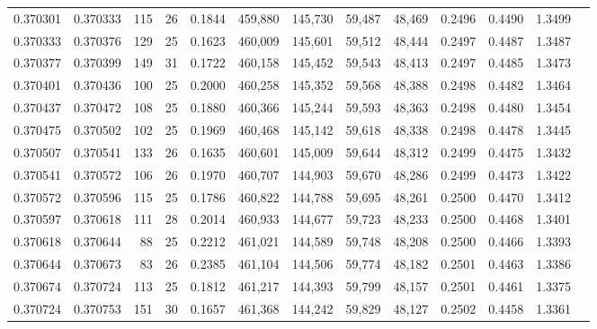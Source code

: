 \begin{tabular}{rrrrrrrrrrrrr}
0.370301 & 0.370333 &   115 &  26 &                                     0.1844 & 459,880 & 145,730 &  59,487 &  48,469 & 0.2496 & 0.4490 & 1.3499 \\
0.370333 & 0.370376 &   129 &  25 &                                     0.1623 & 460,009 & 145,601 &  59,512 &  48,444 & 0.2497 & 0.4487 & 1.3487 \\
0.370377 & 0.370399 &   149 &  31 &                                     0.1722 & 460,158 & 145,452 &  59,543 &  48,413 & 0.2497 & 0.4485 & 1.3473 \\
0.370401 & 0.370436 &   100 &  25 &                                     0.2000 & 460,258 & 145,352 &  59,568 &  48,388 & 0.2498 & 0.4482 & 1.3464 \\
0.370437 & 0.370472 &   108 &  25 &                                     0.1880 & 460,366 & 145,244 &  59,593 &  48,363 & 0.2498 & 0.4480 & 1.3454 \\
0.370475 & 0.370502 &   102 &  25 &                                     0.1969 & 460,468 & 145,142 &  59,618 &  48,338 & 0.2498 & 0.4478 & 1.3445 \\
0.370507 & 0.370541 &   133 &  26 &                                     0.1635 & 460,601 & 145,009 &  59,644 &  48,312 & 0.2499 & 0.4475 & 1.3432 \\
0.370541 & 0.370572 &   106 &  26 &                                     0.1970 & 460,707 & 144,903 &  59,670 &  48,286 & 0.2499 & 0.4473 & 1.3422 \\
0.370572 & 0.370596 &   115 &  25 &                                     0.1786 & 460,822 & 144,788 &  59,695 &  48,261 & 0.2500 & 0.4470 & 1.3412 \\
0.370597 & 0.370618 &   111 &  28 &                                     0.2014 & 460,933 & 144,677 &  59,723 &  48,233 & 0.2500 & 0.4468 & 1.3401 \\
0.370618 & 0.370644 &    88 &  25 &                                     0.2212 & 461,021 & 144,589 &  59,748 &  48,208 & 0.2500 & 0.4466 & 1.3393 \\
0.370644 & 0.370673 &    83 &  26 &                                     0.2385 & 461,104 & 144,506 &  59,774 &  48,182 & 0.2501 & 0.4463 & 1.3386 \\
0.370674 & 0.370724 &   113 &  25 &                                     0.1812 & 461,217 & 144,393 &  59,799 &  48,157 & 0.2501 & 0.4461 & 1.3375 \\
0.370724 & 0.370753 &   151 &  30 &                                     0.1657 & 461,368 & 144,242 &  59,829 &  48,127 & 0.2502 & 0.4458 & 1.3361 \\

\end{tabular}
